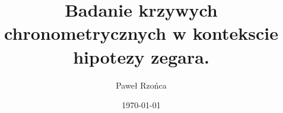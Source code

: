 \title{Badanie krzywych chronometrycznych w kontekscie hipotezy zegara.}
\author{Paweł Rzońca}
\date{\today}
\graphicspath{{/home/galeon/Labor/czas/main/images/}}

\renewcommand{\figurename}{Rys.}
\renewcommand{\tablename}{Tab.}
\renewcommand{\abstractname}{Abstrakt}


\renewcommand{\d}{\text{d}}
\newcommand{\D}{\text{D}}


\theoremstyle{definition}
\newtheorem{definition}{Definicja}

\theoremstyle{theorem}
\newtheorem{theorem}{Twierdzenie}
